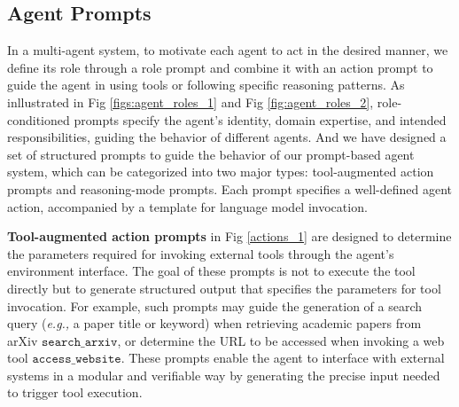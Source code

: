 \documentclass{article}
\newcommand{\eg}{\textit{e.g., }}
\begin{document}
\subsection{Agent Prompts}
In a multi-agent system, to motivate each agent to act in the desired manner, we define its role through a role prompt and combine it with an action prompt to guide the agent in using tools or following specific reasoning patterns. As inllustrated in Fig \ref{figs:agent_roles_1} and Fig \ref{fig:agent_roles_2}, role-conditioned prompts specify the agent’s identity, domain expertise, and intended responsibilities, guiding the behavior of different agents. And we have designed a set of structured prompts to guide the behavior of our prompt-based agent system, which can be categorized into two major types: tool-augmented action prompts and reasoning-mode prompts. Each prompt specifies a well-defined agent action, accompanied by a template for language model invocation.

\textbf{Tool-augmented action prompts} in Fig \ref{actions_1} are designed to determine the parameters required for invoking external tools through the agent’s environment interface. The goal of these prompts is not to execute the tool directly but to generate structured output that specifies the parameters for tool invocation. For example, such prompts may guide the generation of a search query (\eg a paper title or keyword) when retrieving academic papers from arXiv \(\texttt{search\_arxiv}\), or determine the URL to be accessed when invoking a web tool \(\texttt{access\_website}\). These prompts enable the agent to interface with external systems in a modular and verifiable way by generating the precise input needed to trigger tool execution.
\end{document}
